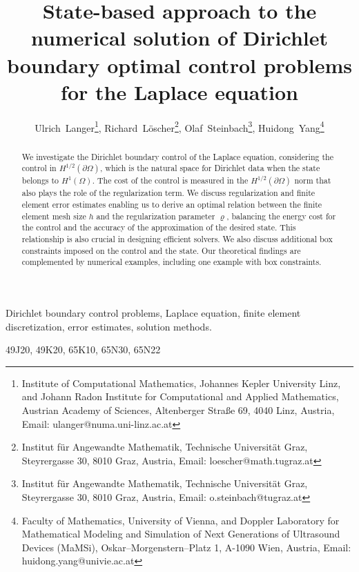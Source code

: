 \documentclass{article}
\title{State-based approach to the numerical solution of Dirichlet boundary 
              optimal control problems for the Laplace equation}
\author{Ulrich~Langer\footnote{Institute of Computational Mathematics,
    Johannes Kepler University Linz, 
    and Johann Radon Institute for Computational and Applied Mathematics,
    Austrian Academy of Sciences,
    Altenberger Stra{\ss}e 69, 4040 Linz,
    Austria, Email: ulanger@numa.uni-linz.ac.at},
  \;
  Richard~L\"oscher\footnote{Institut f\"{u}r Angewandte Mathematik,
    Technische Universit\"{a}t Graz, Steyrergasse 30, 8010 Graz, Austria,
    Email: loescher@math.tugraz.at}, 
  \; Olaf~Steinbach\footnote{Institut f\"{u}r Angewandte Mathematik,
    Technische Universit\"{a}t Graz, Steyrergasse 30, 8010 Graz, Austria,
    Email: o.steinbach@tugraz.at}, 
  \; Huidong~Yang\footnote{Faculty of Mathematics, University of Vienna,
  and 
  Doppler Laboratory for Mathematical Modeling and Simulation of Next
  Generations of Ultrasound Devices (MaMSi),
  Oskar--Morgenstern--Platz 1, A-1090 Wien, Austria, Email: huidong.yang@univie.ac.at}
}
\date{}
\numberwithin{equation}{section}
\begin{document}
\maketitle

\begin{abstract}
We investigate the Dirichlet boundary control of the Laplace equation,
considering the control in $H^{1/2}(\partial \Omega)$, which is the natural
space for Dirichlet data when the state belongs to $H^1(\Omega)$. The cost
of the control is measured in the $H^{1/2}(\partial \Omega)$ norm that also
plays the role of the regularization term. We discuss regularization and
finite element error estimates enabling us to derive an optimal relation
between the finite element mesh size $h$ and the regularization parameter
$\varrho$, balancing the energy cost for the control and the accuracy of
the approximation of the desired state. This relationship is also crucial in
designing efficient solvers. We also discuss additional  box constraints
imposed on the control and the state. Our theoretical findings are
complemented by numerical examples, including one example with box constraints.
\end{abstract} 

\noindent
\begin{keywords}
  Dirichlet boundary control problems, Laplace equation,
  finite element discretization, error estimates, solution methods.
\end{keywords}

\medskip

\noindent
\begin{msc}
49J20, %
49K20,  %
65K10, %
65N30, %
65N22  %
\end{msc}
\end{document}
